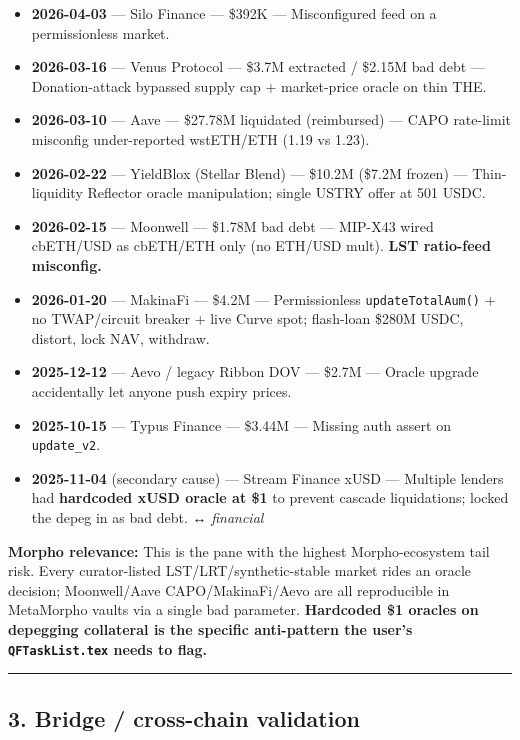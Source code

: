 \begin{itemize}
\tightlist
\item
  \textbf{2026-04-03} --- Silo Finance --- \$392K --- Misconfigured feed on a permissionless market.
\item
  \textbf{2026-03-16} --- Venus Protocol --- \$3.7M extracted / \$2.15M bad debt --- Donation-attack bypassed supply cap + market-price oracle on thin THE.
\item
  \textbf{2026-03-10} --- Aave --- \$27.78M liquidated (reimbursed) --- CAPO rate-limit misconfig under-reported wstETH/ETH (1.19 vs 1.23).
\item
  \textbf{2026-02-22} --- YieldBlox (Stellar Blend) --- \$10.2M (\$7.2M frozen) --- Thin-liquidity Reflector oracle manipulation; single USTRY offer at 501 USDC.
\item
  \textbf{2026-02-15} --- Moonwell --- \$1.78M bad debt --- MIP-X43 wired cbETH/USD as cbETH/ETH only (no ETH/USD mult). \textbf{LST ratio-feed misconfig.}
\item
  \textbf{2026-01-20} --- MakinaFi --- \$4.2M --- Permissionless \texttt{updateTotalAum()} + no TWAP/circuit breaker + live Curve spot; flash-loan \$280M USDC, distort, lock NAV, withdraw.
\item
  \textbf{2025-12-12} --- Aevo / legacy Ribbon DOV --- \$2.7M --- Oracle upgrade accidentally let anyone push expiry prices.
\item
  \textbf{2025-10-15} --- Typus Finance --- \$3.44M --- Missing auth assert on \texttt{update\_v2}.
\item
  \textbf{2025-11-04} (secondary cause) --- Stream Finance xUSD --- Multiple lenders had \textbf{hardcoded xUSD oracle at \$1} to prevent cascade liquidations; locked the depeg in as bad debt. ↔ \emph{financial}
\end{itemize}

\textbf{Morpho relevance:} This is the pane with the highest Morpho-ecosystem tail risk. Every curator-listed LST/LRT/synthetic-stable market rides an oracle decision; Moonwell/Aave CAPO/MakinaFi/Aevo are all reproducible in MetaMorpho vaults via a single bad parameter. \textbf{Hardcoded \$1 oracles on depegging collateral is the specific anti-pattern the user's \texttt{QFTaskList.tex} needs to flag.}

\begin{center}\rule{0.5\linewidth}{0.5pt}\end{center}

\subsection{3. Bridge / cross-chain validation}\label{bridge-cross-chain-validation}

